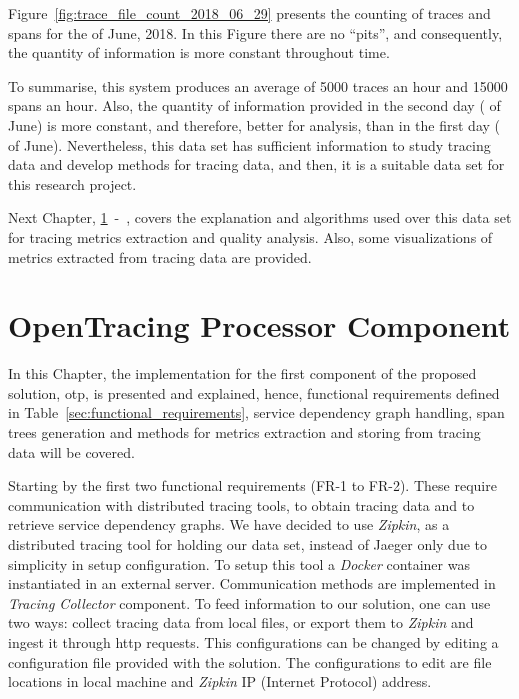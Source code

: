 Figure~\ref{fig:trace_file_count_2018_06_29} presents the counting of traces and spans for the  of June, 2018. In this Figure there are no ``pits'', and consequently, the quantity of information is more constant throughout time.

To summarise, this system produces an average of 5000 traces an hour and 15000 spans an hour. Also, the quantity of information provided in the second day ( of June) is more constant, and therefore, better for analysis, than in the first day ( of June). Nevertheless, this data set has sufficient information to study tracing data and develop methods for tracing data, and then, it is a suitable data set for this research project.

Next Chapter, \ref{sec:open_tracing_processor_component}~-~, covers the explanation and algorithms used over this data set for tracing metrics extraction and quality analysis. Also, some visualizations of metrics extracted from tracing data are provided.

\newpage

\section{OpenTracing Processor Component}
\label{sec:open_tracing_processor_component}

In this Chapter, the implementation for the first component of the proposed solution, \gls{otp}, is presented and explained, hence, functional requirements defined in Table~\ref{sec:functional_requirements}, service dependency graph handling, span trees generation and methods for metrics extraction and storing from tracing data will be covered.

Starting by the first two functional requirements (FR-1 to FR-2). These require communication with distributed tracing tools, to obtain tracing data and to retrieve service dependency graphs. We have decided to use \emph{Zipkin}, as a distributed tracing tool for holding our data set, instead of Jaeger only due to simplicity in setup configuration. To setup this tool a \emph{Docker} container was instantiated in an external server. Communication methods are implemented in \emph{Tracing Collector} component. To feed information to our solution, one can use two ways: collect tracing data from local files, or export them to \emph{Zipkin} and ingest it through \gls{http} requests. This configurations can be changed by editing a configuration file provided with the solution. The configurations to edit are file locations in local machine and \emph{Zipkin} IP (Internet Protocol) address.

